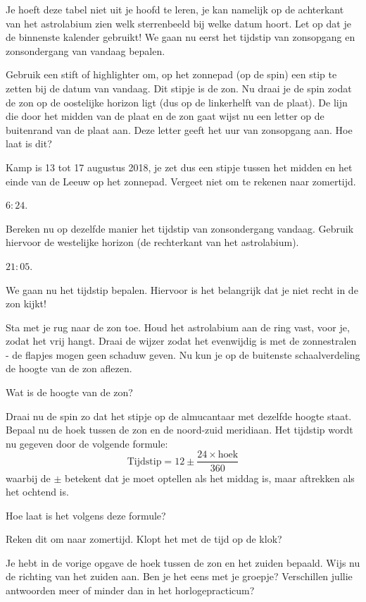 Je hoeft deze tabel niet uit je hoofd te leren, je kan namelijk op de achterkant van het astrolabium zien welk sterrenbeeld bij welke datum hoort. Let op dat je de binnenste kalender gebruikt! We gaan nu eerst het tijdstip van zonsopgang en zonsondergang van vandaag bepalen. 
\begin{opgave}
 Gebruik een stift of highlighter om, op het zonnepad (op de spin) een stip te zetten bij de datum van vandaag. Dit stipje is de zon. Nu draai je de spin zodat de zon op de oostelijke horizon ligt (dus op de linkerhelft van de plaat). De lijn die door het midden van de plaat en de zon gaat wijst nu een letter op de buitenrand van de plaat aan. Deze letter geeft het uur van zonsopgang aan. Hoe laat is dit?
 \begin{hint}
  Kamp is 13 tot 17 augustus 2018, je zet dus een stipje tussen het midden en het einde van de Leeuw op het zonnepad. Vergeet niet om te rekenen naar zomertijd.
 \end{hint}
 \begin{antwoord}
  $6:24$.
 \end{antwoord}
\end{opgave}

\begin{opgave}
 Bereken nu op dezelfde manier het tijdstip van zonsondergang vandaag. Gebruik hiervoor de westelijke horizon (de rechterkant van het astrolabium). 
 \begin{antwoord}
  $21:05$.
 \end{antwoord}
\end{opgave}

We gaan nu het tijdstip bepalen. Hiervoor is het belangrijk dat je niet recht in de zon kijkt!
\begin{opgave}
 Sta met je rug naar de zon toe. Houd het astrolabium aan de ring vast, voor je, zodat het vrij hangt. Draai de wijzer zodat het evenwijdig is met de zonnestralen - de flapjes mogen geen schaduw geven. Nu kun je op de buitenste schaalverdeling de hoogte van de zon aflezen. 
 \begin{subopgave}
 Wat is de hoogte van de zon?
 \end{subopgave}
 Draai nu de spin zo dat het stipje op de almucantaar met dezelfde hoogte staat. Bepaal nu de hoek tussen de zon en de noord-zuid meridiaan. Het tijdstip wordt nu gegeven door de volgende formule:
 \[ \textrm{Tijdstip} = 12 \pm \frac{24\times\textrm{hoek}}{360} \]
 waarbij de $\pm$ betekent dat je moet optellen als het middag is, maar aftrekken als het ochtend is.
 \begin{subopgave}
  Hoe laat is het volgens deze formule?
 \end{subopgave}
 \begin{subopgave}
  Reken dit om naar zomertijd. Klopt het met de tijd op de klok?
 \end{subopgave}
\end{opgave}

\begin{opgave}[\discussie]
 Je hebt in de vorige opgave de hoek tussen de zon en het zuiden bepaald. Wijs nu de richting van het zuiden aan. Ben je het eens met je groepje? Verschillen jullie antwoorden meer of minder dan in het horlogepracticum?
\end{opgave}

